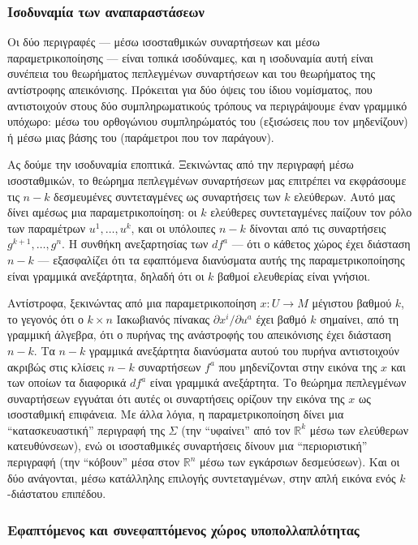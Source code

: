 \documentclass[11pt,a4paper,twoside,openright]{book}
\begin{document}
\subsubsection{Ισοδυναμία των αναπαραστάσεων}

Οι δύο περιγραφές --- μέσω ισοσταθμικών συναρτήσεων και μέσω παραμετρικοποίησης --- είναι τοπικά ισοδύναμες, και η ισοδυναμία αυτή είναι συνέπεια του θεωρήματος πεπλεγμένων συναρτήσεων και του θεωρήματος της αντίστροφης απεικόνισης. Πρόκειται για δύο όψεις του ίδιου νομίσματος, που αντιστοιχούν στους δύο συμπληρωματικούς τρόπους να περιγράψουμε έναν γραμμικό υπόχωρο: μέσω του ορθογώνιου συμπληρώματός του (εξισώσεις που τον μηδενίζουν) ή μέσω μιας βάσης του (παράμετροι που τον παράγουν).

Ας δούμε την ισοδυναμία εποπτικά. Ξεκινώντας από την περιγραφή μέσω ισοσταθμικών, το θεώρημα πεπλεγμένων συναρτήσεων μας επιτρέπει να εκφράσουμε τις $n-k$ δεσμευμένες συντεταγμένες ως συναρτήσεις των $k$ ελεύθερων. Αυτό μας δίνει αμέσως μια παραμετρικοποίηση: οι $k$ ελεύθερες συντεταγμένες παίζουν τον ρόλο των παραμέτρων $u^1, \dots, u^k$, και οι υπόλοιπες $n-k$ δίνονται από τις συναρτήσεις $g^{k+1}, \dots, g^n$. Η συνθήκη ανεξαρτησίας των $df^a$ --- ότι ο κάθετος χώρος έχει διάσταση $n-k$ --- εξασφαλίζει ότι τα εφαπτόμενα διανύσματα αυτής της παραμετρικοποίησης είναι γραμμικά ανεξάρτητα, δηλαδή ότι οι $k$ βαθμοί ελευθερίας είναι γνήσιοι.

Αντίστροφα, ξεκινώντας από μια παραμετρικοποίηση $x: U \to M$ μέγιστου βαθμού $k$, το γεγονός ότι ο $k \times n$ Ιακωβιανός πίνακας $\partial x^i / \partial u^a$ έχει βαθμό $k$ σημαίνει, από τη γραμμική άλγεβρα, ότι ο πυρήνας της ανάστροφής του απεικόνισης έχει διάσταση $n-k$. Τα $n-k$ γραμμικά ανεξάρτητα διανύσματα αυτού του πυρήνα αντιστοιχούν ακριβώς στις κλίσεις $n-k$ συναρτήσεων $f^a$ που μηδενίζονται στην εικόνα της $x$ και των οποίων τα διαφορικά $df^a$ είναι γραμμικά ανεξάρτητα. Το θεώρημα πεπλεγμένων συναρτήσεων εγγυάται ότι αυτές οι συναρτήσεις ορίζουν την εικόνα της $x$ ως ισοσταθμική επιφάνεια. Με άλλα λόγια, η παραμετρικοποίηση δίνει μια ``κατασκευαστική'' περιγραφή της $\Sigma$ (την ``υφαίνει'' από τον $\mathbb{R}^k$ μέσω των ελεύθερων κατευθύνσεων), ενώ οι ισοσταθμικές συναρτήσεις δίνουν μια ``περιοριστική'' περιγραφή (την ``κόβουν'' μέσα στον $\mathbb{R}^n$ μέσω των εγκάρσιων δεσμεύσεων). Και οι δύο ανάγονται, μέσω κατάλληλης επιλογής συντεταγμένων, στην απλή εικόνα ενός $k$-διάστατου επιπέδου.

\subsubsection{Εφαπτόμενος και συνεφαπτόμενος χώρος υποπολλαπλότητας}
\end{document}

